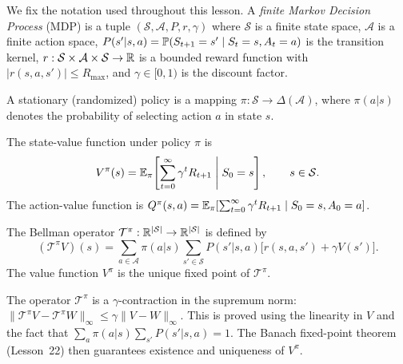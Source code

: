 \documentclass[11pt,a4paper]{article}
\begin{document}
We fix the notation used throughout this lesson.  A \emph{finite
Markov Decision Process} (MDP) is a tuple
$(\mathcal{S}, \mathcal{A}, P, r, \gamma)$ where
$\mathcal{S}$ is a finite state space,
$\mathcal{A}$ is a finite action space,
$P(s'|s,a) = \mathbb{P}(S_{t+1}=s' \mid S_t=s, A_t=a)$ is the
transition kernel,
$r: \mathcal{S} \times \mathcal{A} \times \mathcal{S} \to \mathbb{R}$
is a bounded reward function with $|r(s,a,s')| \leq R_{\max}$,
and $\gamma \in [0,1)$ is the discount factor.

\begin{definition}
\label{def:policy}
A stationary (randomized) policy is a mapping
$\pi: \mathcal{S} \to \Delta(\mathcal{A})$, where
$\pi(a|s)$ denotes the probability of selecting action $a$ in
state $s$.
\end{definition}

\begin{definition}
\label{def:value}
The state-value function under policy $\pi$ is
\begin{equation}
  V^\pi(s)
  = \mathbb{E}_\pi\!\left[\sum_{t=0}^{\infty} \gamma^t R_{t+1}
    \;\middle|\; S_0 = s\right],
  \qquad s \in \mathcal{S}.
  \label{eq:value}
\end{equation}
The action-value function is
$Q^\pi(s,a)
= \mathbb{E}_\pi[\sum_{t=0}^{\infty} \gamma^t R_{t+1}
  \mid S_0=s, A_0=a]$.
\end{definition}

\begin{definition}
\label{def:bellman}
The Bellman operator $\mathcal{T}^\pi: \mathbb{R}^{|\mathcal{S}|}
\to \mathbb{R}^{|\mathcal{S}|}$ is defined by
\begin{equation}
  (\mathcal{T}^\pi V)(s)
  = \sum_{a \in \mathcal{A}} \pi(a|s)
    \sum_{s' \in \mathcal{S}} P(s'|s,a)
    \bigl[r(s,a,s') + \gamma V(s')\bigr].
  \label{eq:bellman_op}
\end{equation}
The value function $V^\pi$ is the unique fixed point of
$\mathcal{T}^\pi$.
\end{definition}

\begin{remark}
\label{rem:contraction}
The operator $\mathcal{T}^\pi$ is a $\gamma$-contraction in
the supremum norm: $\|\mathcal{T}^\pi V - \mathcal{T}^\pi W
\|_\infty \leq \gamma \|V - W\|_\infty$.  This is proved
using the linearity in $V$ and the fact that
$\sum_{a}\pi(a|s)\sum_{s'}P(s'|s,a) = 1$.  The Banach
fixed-point theorem (Lesson~22) then guarantees existence and
uniqueness of $V^\pi$.
\end{remark}
\end{document}
